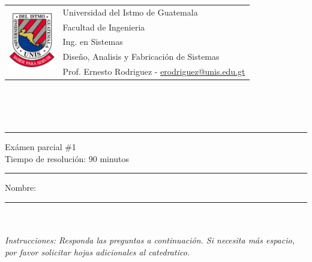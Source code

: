 \documentclass{article}
\newcommand{\horrule}[1]{\rule{\linewidth}{#1}}
\newcommand{\perlscript}[2]{
\begin{itemize}
\item[]
\end{itemize}
}
\begin{document}
\begin{tabular}{l l}
\multirow{5}{*}{\includegraphics[width=2cm]{../Recursos/logo.png}} & Universidad del Istmo de Guatemala \\
 & Facultad de Ingenieria \\
 & Ing. en Sistemas \\
 & Dise\~no, Analisis y Fabricaci\'on de Sistemas \\
 & Prof. Ernesto Rodriguez - \href{mailto:erodriguez@unis.edu.gt}{erodriguez@unis.edu.gt} \\
\end{tabular}
\\\\\\

\begin{center}
        \horrule{0.5pt}
        \huge{Ex\'amen parcial \#1} \\
        \large{Tiempo de resoluci\'on: 90 minutos} \\
        \horrule{1pt}
\end{center}
\vspace{0.3cm}
Nombre: \noindent\rule{8cm}{0.4pt}
\\\vspace{0.1cm}\\\emph{Instrucciones: Responda las preguntas a continuaci\'on. Si necesita m\'as espacio, por favor solicitar
hojas adicionales al catedratico.}

\end{document}
